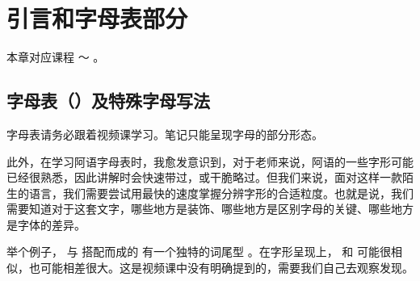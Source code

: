 \chapter{引言和字母表部分}

本章对应课程  ～  。

\section{字母表（）及特殊字母写法}

\begin{note}
    字母表请务必跟着视频课学习。笔记只能呈现字母的部分形态。

    此外，在学习阿语字母表时，我愈发意识到，对于老师来说，阿语的一些字形可能已经很熟悉，因此讲解时会快速带过，或干脆略过。但我们来说，面对这样一款陌生的语言，我们需要尝试用最快的速度掌握分辨字形的合适粒度。也就是说，我们需要知道对于这套文字，哪些地方是装饰、哪些地方是区别字母的关键、哪些地方是字体的差异。

    举个例子， 与  搭配而成的  有一个独特的词尾型 。在字形呈现上，  和  可能很相似，也可能相差很大。这是视频课中没有明确提到的，需要我们自己去观察发现。
\end{note}

